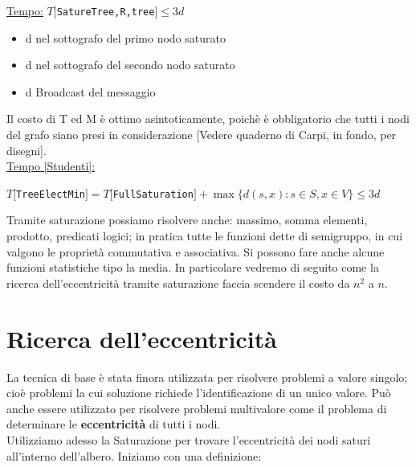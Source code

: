 \underline{Tempo:}
$T[$\texttt{SatureTree,R,tree}$] \leq 3d$
\begin{itemize}
    \item d nel sottografo del primo nodo saturato
    \item d nel sottografo del secondo nodo saturato
    \item d Broadcast del messaggio
\end{itemize}


Il costo di T ed M è ottimo asintoticamente, poichè è obbligatorio che tutti i nodi del grafo siano presi in considerazione [Vedere quaderno di Carpi, in fondo, per disegni].\\
\underline{Tempo [Studenti]:}
\begin{center}
  $T[$\texttt{TreeElectMin}$] = T[$\texttt{FullSaturation}$] + \max \{ d(s, x) : s \in S, x \in V \} \leq 3d$
\end{center}

Tramite saturazione possiamo risolvere anche: massimo, somma elementi, prodotto, predicati logici; in pratica tutte le funzioni dette di semigruppo, in cui valgono le proprietà commutativa e associativa. Si possono fare anche alcune funzioni statistiche tipo la media. In particolare vedremo di seguito come la ricerca dell'eccentricità tramite saturazione faccia scendere il costo da $n^2$ a $n$.

\section{Ricerca dell'eccentricità}
La tecnica di base è stata finora utilizzata per risolvere problemi a valore singolo; cioè problemi la cui soluzione richiede l'identificazione di un unico valore. Può anche essere utilizzato per risolvere problemi multivalore come il problema di determinare le \textbf{eccentricità} di tutti i nodi.\\
Utilizziamo adesso la Saturazione per trovare l'eccentricità dei nodi saturi all'interno dell'albero. Iniziamo con una definizione:\\
\\

